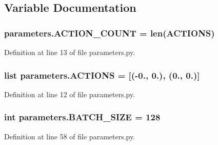 \subsection{Variable Documentation}
\subsubsection[{\texorpdfstring{A\+C\+T\+I\+O\+N\+\_\+\+C\+O\+U\+NT}{ACTION_COUNT}}]{\setlength{\rightskip}{0pt plus 5cm}parameters.\+A\+C\+T\+I\+O\+N\+\_\+\+C\+O\+U\+NT = len({\bf A\+C\+T\+I\+O\+NS})}\hypertarget{namespaceparameters_ae4be13f6dac91f471da3efb4618a54c1}{}\label{namespaceparameters_ae4be13f6dac91f471da3efb4618a54c1}


Definition at line 13 of file parameters.\+py.

\subsubsection[{\texorpdfstring{A\+C\+T\+I\+O\+NS}{ACTIONS}}]{\setlength{\rightskip}{0pt plus 5cm}list parameters.\+A\+C\+T\+I\+O\+NS = \mbox{[}(-\/0., 0.), (0., 0.)\mbox{]}}\hypertarget{namespaceparameters_a585a25d0a26bcab4242d2e3fb1c1f93e}{}\label{namespaceparameters_a585a25d0a26bcab4242d2e3fb1c1f93e}


Definition at line 12 of file parameters.\+py.

\subsubsection[{\texorpdfstring{B\+A\+T\+C\+H\+\_\+\+S\+I\+ZE}{BATCH_SIZE}}]{\setlength{\rightskip}{0pt plus 5cm}int parameters.\+B\+A\+T\+C\+H\+\_\+\+S\+I\+ZE = 128}\hypertarget{namespaceparameters_a2d37d9950f7a887014021ab455282af6}{}\label{namespaceparameters_a2d37d9950f7a887014021ab455282af6}


Definition at line 58 of file parameters.\+py.

